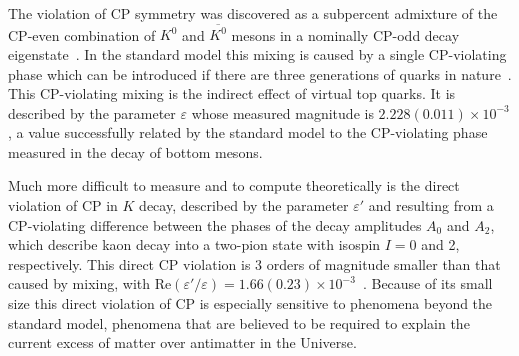 \documentclass[aps,prl,
superscriptaddress,
showpacs,
preprintnumbers,
bibnotes,
amsmath,
amssymb,
twocolumn,
floatfix,
]{revtex4-1}
\begin{document}

\preprint{}

\maketitle

The violation of CP symmetry was discovered as a subpercent admixture of the CP-even combination of $K^0$ and $\overline{K^0}$ mesons in a nominally CP-odd decay eigenstate~\cite{Christenson:1964fg}.   In the standard model this mixing is caused by a single CP-violating phase which can be introduced if there are three generations of quarks in nature~\cite{Kobayashi:1973fv}.  This CP-violating mixing is the indirect effect of virtual top quarks.  It is described by the parameter $\varepsilon$ whose measured magnitude is $2.228 (0.011) \times 10^{-3}$, a value successfully related by the standard model to the CP-violating phase measured in the decay of bottom mesons.  

Much more difficult to measure and to compute theoretically is the direct violation of CP in $K$ decay, described by the parameter $\varepsilon'$ and resulting from a CP-violating difference between the phases of the decay amplitudes $A_0$ and $A_2$, which describe kaon decay into a two-pion state with isospin $I=0$ and 2, respectively.  This direct CP violation is 3 orders of magnitude smaller than that caused by mixing, with Re$(\varepsilon'/\varepsilon) = 1.66(0.23) \times 10^{-3}$~\cite{Batley:2002gn,AlaviHarati:2002ye,PhysRevD.70.079904, Kleinknecht:2003td,Agashe:2014kda}.  Because of its small size this direct violation of CP is especially sensitive to phenomena beyond the standard model, phenomena that are believed to be required to explain the current excess of matter over antimatter in the Universe.
\end{document}
